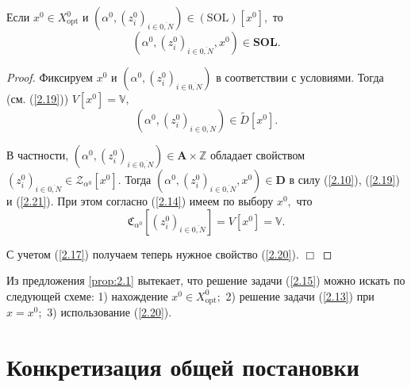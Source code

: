 \documentclass[10pt]{SPIIRAS_Proceedings}
\begin{document}
\begin{proposition}
\label{prop:2.1}
Если
$x^0 \in X^0_{\mathrm{opt}}$ и $(\alpha^0,(z_i^0)_{i \in \overline{0,N}}) \in (\mathrm{SOL})[x^0],$
то
\begin{equation}\label{2.20}
  (\alpha^0,(z_i^0)_{i \in \overline{0,N}},x^0) \in \mathbf{SOL}.
\end{equation}
\end{proposition}

\begin{proof}

Фиксируем $x^0$ и $(\alpha^0,(z_i^0)_{i \in \overline{0,N}})$
в соответствии с условиями.
Тогда (см. (\ref{2.19}))
$V[x^0] = \mathbb{V},$
\begin{equation}\label{2.21}
 (\alpha^0,(z_i^0)_{i \in \overline{0,N}}) \in \tilde{D}[x^0].
\end{equation}

В частности,
$(\alpha^0,(z_i^0)_{i \in \overline{0,N}}) \in \mathbf{A} \times \mathbb{Z}$
обладает свойством
$(z_i^0)_{i \in \overline{0,N}} \in \mathcal{Z}_{\alpha^0}[x^0].$
Тогда
$(\alpha^0,(z_i^0)_{i \in \overline{0,N}},x^0) \in \mathbf{D}$
в силу (\ref{2.10}), (\ref{2.19}) и (\ref{2.21}).
При этом согласно (\ref{2.14})
имеем по выбору $x^0,$ что
$$
  \mathfrak{C}_{\alpha^0}[(z_i^0)_{i \in \overline{0,N}}] = V[x^0] = \mathbb{V}.
$$

С учетом (\ref{2.17}) получаем теперь нужное свойство (\ref{2.20}).
\hfill $\Box$
\end{proof}

Из предложения \ref{prop:2.1} вытекает,
что решение задачи (\ref{2.15})
можно искать по следующей схеме:
1) нахождение $x^0 \in X^0_{\mathrm{opt}};$
2) решение задачи (\ref{2.13}) при $x = x^0;$
3) использование (\ref{2.20}).

\section{Конкретизация общей постановки}
\label{sec:3}
\end{document}
